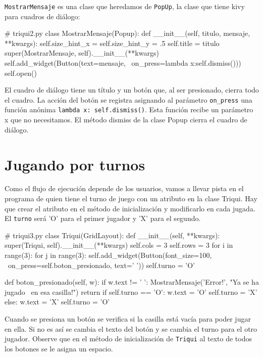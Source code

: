 \texttt{MostrarMensaje} es una clase que heredamos de \texttt{PopUp},
la clase que tiene kivy para cuadros de diálogo:

\begin{pythoncode}
# triqui2.py
class MostrarMensaje(Popup): 
    def __init__(self, titulo, mensaje, **kwargs):
        self.size_hint_x = self.size_hint_y = .5
        self.title = titulo
        super(MostrarMensaje, self).__init__(**kwargs)
        self.add_widget(Button(text=mensaje, \
                        on_press=lambda x:self.dismiss()))
        self.open()
\end{pythoncode}

El cuadro de diálogo tiene un título y un botón que, al ser presionado,
cierra todo el cuadro. La acción del botón se registra asignando al
parámetro \texttt{on\_press}
una función anónima \texttt{lambda x: self.dismiss()}.
Esta función recibe un parámetro x que no necesitamos. El método dismiss
de la clase Popup cierra el cuadro de diálogo.

\section{Jugando por turnos}

Como el flujo de ejecución depende de los usuarios, vamos a llevar
pista en el programa de quien tiene el turno de juego con un atributo
en la clase Triqui. Hay que crear el atributo en el método de inicialización
y modificarlo en cada jugada. El \texttt{turno} será 'O' para el primer
jugador y 'X' para el segundo.

\begin{pythoncode}
# triqui3.py
class Triqui(GridLayout):
    def __init__(self, **kwargs):
        super(Triqui, self).__init__(**kwargs)
        self.cols = 3
        self.rows = 3
        for i in range(3):
            for j in range(3):
                self.add_widget(Button(font_size=100, \
                  on_press=self.boton_presionado, text=' '))
        self.turno = 'O'

    def boton_presionado(self, w):
        if w.text != ' ':
            MostrarMensaje('Error!', "Ya se ha jugado \
                            en esa casilla!")
            return
        if self.turno == 'O':
            w.text =  'O'
            self.turno = 'X'
        else:
            w.text = 'X'
            self.turno = 'O'
\end{pythoncode}

Cuando se presiona un botón se verifica si la casilla está vacía para
poder jugar en ella. Si no es así se cambia el texto del botón y se
cambia el turno para el otro jugador. Observe que en el método de
inicialización de \texttt{Triqui} al texto de todos los botones se
le asigna un espacio.

